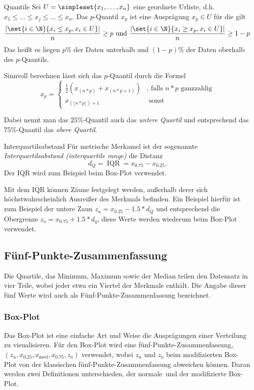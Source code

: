 \begin{definition}{Quantile}
	Sei $U=\simpleset{x_1,\ldots,x_n}$ eine geordnete Urliste, d.h. $x_1\leq\ldots\leq x_j\leq\ldots\leq x_n$. Das $p$-Quantil $x_p$ ist eine Ausprägung $x_p\in U$ für die gilt
	\begin{equation*}
		\frac{\left|\set{i\in\N}{x_i\leq x_p, x_i\in U}\right|}{n}\geq p \text{ und } \frac{\left|\set{i\in\N}{x_i\geq x_p, x_i\in U}\right|}{n}\geq 1-p
	\end{equation*}
	Das heißt es liegen $p\%$ der Daten unterhalb und $(1-p)\%$ der Daten oberhalb des $p$-Quantils.

	Sinnvoll berechnen lässt sich das $p$-Quantil durch die Formel
	\begin{equation*}
		x_p=\begin{cases}
			\frac12(x_{(n*p)}+x_{(n*p+1)}) &\text{, falls $n*p$ ganzzahlig}\\
			x_{(\lfloor n*p\rfloor)+1} &\text{ sonst}
		\end{cases}
	\end{equation*}
\end{definition}
Dabei nennt man das $25\%$-Quantil auch das \emph{untere Quartil} und entsprechend das $75\%$-Quantil das \emph{obere Quartil}.

\begin{definition}{Interquartilsabstand}
	Für metrische Merkamel ist der sogenannte \emph{Interquartilsabstand (interquartile range)} die Distanz
	\begin{equation*}
		d_Q=\operatorname{IQR}=x_{0.75}-x_{0.25}.
	\end{equation*}
	Der IQR wird zum Beispiel beim Box-Plot verwendet. 
\end{definition}
Mit dem IQR können Zäune festgelegt werden, außerhalb derer sich höchstwahrscheinlich Ausreißer des Merkmals befinden. Ein Beispiel hierfür ist zum Beispiel der untere Zaun $z_u=x_{0.25}-1.5*d_Q$ und entsprechend die Obergrenze $z_o=x_{0.75}+1.5*d_q$, diese Werte werden wiederum beim Box-Plot verwendet.

\subsection{Fünf-Punkte-Zusammenfassung}
Die Quartile, das Minimum, Maximum sowie der Median teilen den Datensatz in vier Teile, wobei jeder etwa ein Viertel der Merkmale enthält. Die Angabe dieser fünf Werte wird auch als Fünf-Punkte-Zusammenfassung bezeichnet.

\subsubsection{Box-Plot}
Das Box-Plot ist eine einfache Art und Weise die Ausprägungen einer Verteilung zu visualisieren. Für den Box-Plot wird eine fünf-Punkte-Zusammenfassung, $(z_u, x_{0.25}, x_{\operatorname{med}}, x_{0.75}, z_o)$ verwendet, wobei $z_u$ und $z_o$ beim modifizierten Box-Plot von der klassischen fünf-Punkte-Zusammenfassung abweichen können.
Daran werden zwei Definitionen unterschieden, der \glqq normale\grqq\ und der modifizierte Box-Plot.

